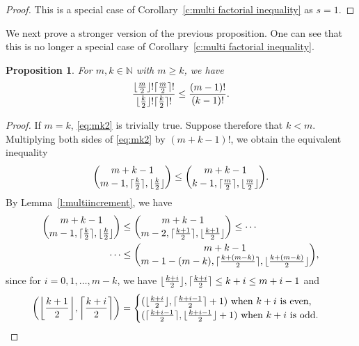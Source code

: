 \documentclass[12pt]{amsart}
\DeclarePairedDelimiter\ceil{\lceil}{\rceil}
\DeclarePairedDelimiter\floor{\lfloor}{\rfloor}
\newtheorem{prop}[thm]{Proposition}
\theoremstyle{definition}
\numberwithin{equation}{section}
\begin{document}
\begin{proof}
    This is a special case of Corollary~\ref{c:multi factorial inequality} as $s=1$.
\end{proof}

We next prove a stronger version of the previous proposition. One can see that this is no longer a special case of Corollary~\ref{c:multi factorial inequality}.

\begin{prop}\label{p:max factorial2}
    For $m,k\in \mathbb N$ with $m \geq k$, we have
    \begin{equation}\label{eq:mk2}
        \frac{\floor{\frac{m}{2}}!\ceil{\frac{m}{2}}!}{\floor{\frac{k}{2}}!\ceil{\frac{k}{2}}!} \leq \frac{(m-1)!}{(k-1)!}.
    \end{equation}
\end{prop}

\begin{proof}
    If $m=k$, \eqref{eq:mk2} is trivially true. Suppose therefore that $k<m$.
    Multiplying both sides of \eqref{eq:mk2} by $(m+k-1)!$, we obtain the equivalent inequality
    \begin{equation}\label{eq:mk2equi}
        {{m+k-1}\choose {m-1, \ceil{\frac{k}{2}}, \floor{\frac{k}{2}}} } \leq { {m+k-1}\choose {k-1, \ceil{\frac{m}{2}}, \floor{\frac{m}{2}}}}.
    \end{equation}
    By Lemma~\ref{l:multiincrement}, we have \begin{equation*}\begin{split}
    {{m+k-1}\choose {m-1, \ceil{\frac{k}{2}}, \floor{\frac{k}{2}}} } &\leq { {m+k-1}\choose {m-2, \ceil{\frac{k+1}{2}}, \floor{\frac{k+1}{2}}}} \leq \cdots \\
   \cdots &\leq {{m+k-1}\choose {m-1 - (m-k), \ceil{\frac{k+(m-k)}{2}}, \floor{\frac{k+(m-k)}{2}}} },
\end{split}\end{equation*} since for $i=0,1,\dotsc, m-k$, we have $\floor{\frac{k+i}{2}}, \ceil{\frac{k+i}{2}} \leq k+i \leq m+i-1$ and \begin{equation*}
    \bigg(\floor*{\frac{k+1}{2}}, \ceil*{\frac{k+i}{2}}\bigg) = \begin{cases}
        (\floor{\frac{k+i}{2}}, \ceil{\frac{k+i-1}{2}}+1) \ \text{when $k + i$ is even,} \\
        (\ceil{\frac{k+i-1}{2}}, \floor{\frac{k+i-1}{2}}+1) \ \text{when $k + i$ is odd.}
    \end{cases}
\end{equation*}
\end{proof}
\end{document}
